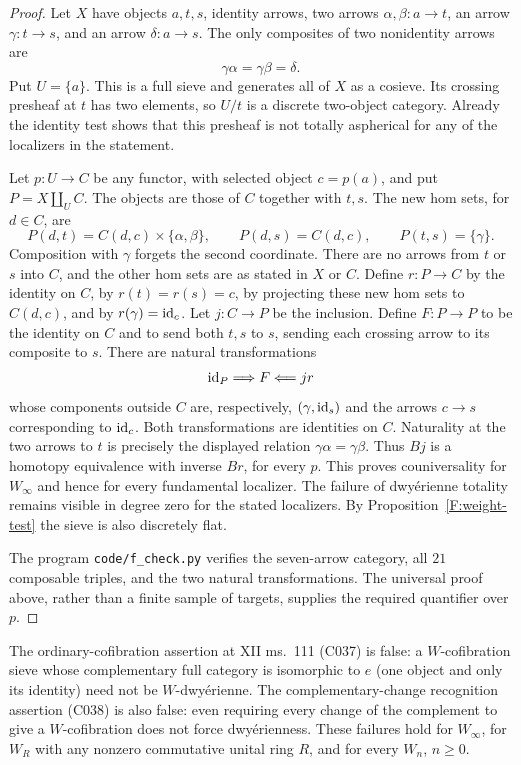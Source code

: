 \begin{proof}
Let $X$ have objects $a,t,s$, identity arrows, two arrows
$\alpha,\beta:a\to t$, an arrow $\gamma:t\to s$, and an
arrow $\delta:a\to s$. The only composites of two nonidentity
arrows are
\[
 \gamma\alpha=\gamma\beta=\delta.
\]
Put $U=\{a\}$. This is a full sieve and generates all of $X$
as a cosieve. Its crossing presheaf at $t$ has two elements, so
$U/t$ is a discrete two-object category. Already the identity
test shows that this presheaf is not totally aspherical for any
of the localizers in the statement.

Let $p:U\to C$ be any functor, with selected object $c=p(a)$,
and put $P=X\amalg_U C$. The objects are those of $C$ together
with $t,s$. The new hom sets, for $d\in C$, are
\[
 P(d,t)=C(d,c)\times\{\alpha,\beta\},\qquad
 P(d,s)=C(d,c),\qquad P(t,s)=\{\gamma\}.
\]
Composition with $\gamma$ forgets the second coordinate. There
are no arrows from $t$ or $s$ into $C$, and the other hom sets
are as stated in $X$ or $C$. Define $r:P\to C$ by the identity
on $C$, by $r(t)=r(s)=c$, by projecting these new hom sets to
$C(d,c)$, and by $r(\gamma)=\mathrm{id}_c$. Let $j:C\to P$ be the
inclusion. Define $F:P\to P$ to be the identity on $C$ and to
send both $t,s$ to $s$, sending each crossing arrow to its
composite to $s$. There are natural transformations
\[
 \mathrm{id}_P\Longrightarrow F\Longleftarrow jr
\]
whose components outside $C$ are, respectively,
$(\gamma,\mathrm{id}_s)$ and the arrows $c\to s$ corresponding to
$\mathrm{id}_c$. Both transformations are identities on $C$. Naturality
at the two arrows to $t$ is precisely the displayed relation
$\gamma\alpha=\gamma\beta$. Thus $Bj$ is a homotopy
equivalence with inverse $Br$, for every $p$. This proves
couniversality for $W_\infty$ and hence for every fundamental
localizer. The failure of dwy\'erienne totality remains visible
in degree zero for the stated localizers. By
Proposition~\ref{F:weight-test} the sieve is also discretely flat.

The program \texttt{code/f\_check.py} verifies the seven-arrow
category, all $21$ composable triples, and the two natural
transformations. The universal proof above, rather than a finite
sample of targets, supplies the required quantifier over $p$.
\end{proof}

\begin{corollary}\label{F:onepoint-cofibration}
The ordinary-cofibration assertion at XII ms.~111
(C037) is false: a $W$-cofibration sieve whose
complementary full category is isomorphic to $e$
(one object and only its identity) need not be
$W$-dwy\'erienne. The
complementary-change recognition assertion (C038)
is also false: even requiring every change of the
complement to give a $W$-cofibration does not force
dwy\'erienness. These failures hold for $W_\infty$,
for $W_R$ with any nonzero commutative unital ring
$R$, and for every $W_n$, $n\geq0$.
\end{corollary}

